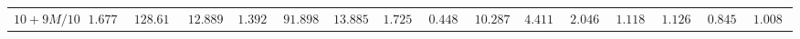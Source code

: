 \begin{table}[]
\begin{tabular}{|c|c|c|c|c|c|c|c|c|c|c|c|c|c|c|c}
$10 + 9M/10$ & $1.677100$                                                        & $128.612700$                                                      & $12.889800$                                                         & $1.392300$                                                           & $91.898300$                                                             & $13.885600$                                                       & $1.725000$                                                          & $0.448100$                                                           & $10.287000$                                                             & $4.411800$                                                        & $2.046800$                                                          & $1.118410$                                                        & $1.126900$                                                          & $0.845430$                                                           & $1.008130$                                                                                   \\ \cline{16-16} 
\end{tabular}
\end{table}
